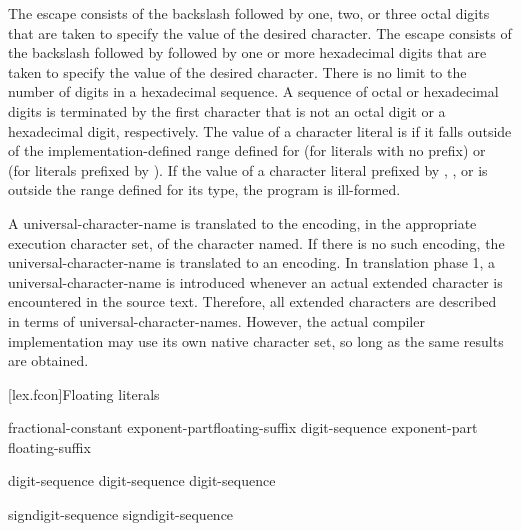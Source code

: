 \pnum
The escape
%
 consists of the backslash followed by one,
two, or three octal digits that are taken to specify the value of the
desired character. The escape
%
consists of the backslash followed by  followed by one or more
hexadecimal digits that are taken to specify the value of the desired
character. There is no limit to the number of digits in a hexadecimal
sequence. A sequence of octal or hexadecimal digits is terminated by the
first character that is not an octal digit or a hexadecimal digit,
respectively.
%
The value of a character literal is  if it falls outside of the implementation-defined range defined for
 (for literals with no prefix) or
 (for literals prefixed by ).
\enternote
If the value of a character literal prefixed by
, , or 
is outside the range defined for its type,
the program is ill-formed.
\exitnote

\pnum
A universal-character-name is translated to the encoding, in the appropriate
execution character set, of the character named. If there is no such
encoding, the universal-character-name is translated to an
 encoding.
\enternote In translation phase 1, a universal-character-name is introduced whenever an
actual extended
character is encountered in the source text. Therefore, all extended
characters are described in terms of universal-character-names. However,
the actual compiler implementation may use its own native character set,
so long as the same results are obtained. \exitnote

[lex.fcon]{Floating literals}

%
\begin{bnf}
\br
    fractional-constant exponent-part\opt floating-suffix\opt\br
    digit-sequence exponent-part floating-suffix\opt
\end{bnf}

\begin{bnf}
\br
    digit-sequence\opt {} digit-sequence\br
    digit-sequence 
\end{bnf}

\begin{bnf}
\br
     sign\opt digit-sequence\br
     sign\opt digit-sequence
\end{bnf}

